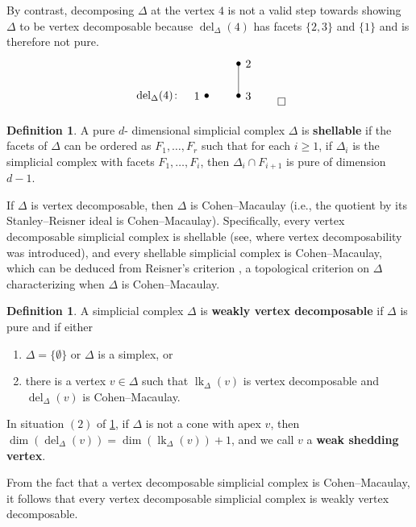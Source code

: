 \documentclass[12pt, reqno]{amsart}
\numberwithin{equation}{section}
\newtheorem{Main Conjecture}[theorem]{Main Conjecture}
\theoremstyle{definition}
\newtheorem{defn}[theorem]{Definition}
\newenvironment{example}
  {\pushQED{\qed}\renewcommand{\qedsymbol}{$\diamondsuit$}\examplex}
  {\popQED\endexamplex}
\theoremstyle{plain}
\DeclareMathOperator{\lk}{lk}
\DeclareMathOperator{\del}{del}
\begin{document}
\begin{example}
By contrast, decomposing $\Delta$ at the vertex $4$ is not a valid step towards showing $\Delta$ to be vertex decomposable because $\del_\Delta(4)$ has facets $\{2,3\}$ and $\{1\}$ and is therefore not pure.
 \[
 \begin{tikzpicture}
\tikzstyle{point}=[inner sep=0pt]
\node at (-1.5,0) {$\del_\Delta(4) \colon$};
\node (a)[point,label=left:$1$] at (0,0) {\tiny{$\bullet$}};
\node (c)[point,label=right:$2$] at (1,1) {\tiny{$\bullet$}};
\node (d)[point,label=right:$3$] at (1,0) {\tiny{$\bullet$}};
\draw (c.center) -- (d.center);
\end{tikzpicture} \qedhere
\]
\end{example}

\begin{defn} A pure $d$- dimensional simplicial complex $\Delta$ is {\bf shellable} if the  facets of $\Delta$ can be ordered as $F_1,\ldots, F_r$ such that for each $i\geq 1$, if $\Delta_i$ is the simplicial complex with facets $F_1, \ldots, F_i$, then $\Delta_i \cap F_{i+1}$  is pure of dimension $d-1$.
\end{defn}

If $\Delta$ is vertex decomposable, then $\Delta$ is Cohen--Macaulay (i.e., the quotient by its Stanley--Reisner ideal is Cohen--Macaulay).  Specifically, every vertex decomposable simplicial complex is shellable (see\cite{PB80}, where vertex decomposability was introduced), and every shellable simplicial complex is Cohen--Macaulay, which can be deduced from Reisner's criterion \cite{Rei76}, a topological criterion on $\Delta$ characterizing when $\Delta$ is Cohen--Macaulay. 


\begin{defn}\label{d:wvd}
A simplicial complex $\Delta$ is {\bf weakly vertex decomposable} if $\Delta$ is pure and if either
\begin{enumerate}
    \item $\Delta = \{\emptyset\}$ or $\Delta$ is a simplex, or
    \item  there is a vertex $v\in \Delta$ such that $\lk_\Delta(v)$ is vertex decomposable and $\del_{\Delta}(v)$ is Cohen--Macaulay. 
\end{enumerate}
\end{defn}

In situation $(2)$ of \cref{d:wvd}, if $\Delta$ is not a cone with apex $v$, then $\dim(\del_\Delta(v)) = \dim(\lk_\Delta(v))+1$, and we call $v$ a {\bf weak shedding vertex}.


From the fact that a vertex decomposable simplicial complex is Cohen--Macaulay, it follows that every vertex decomposable simplicial complex is weakly vertex decomposable.
\end{document}
